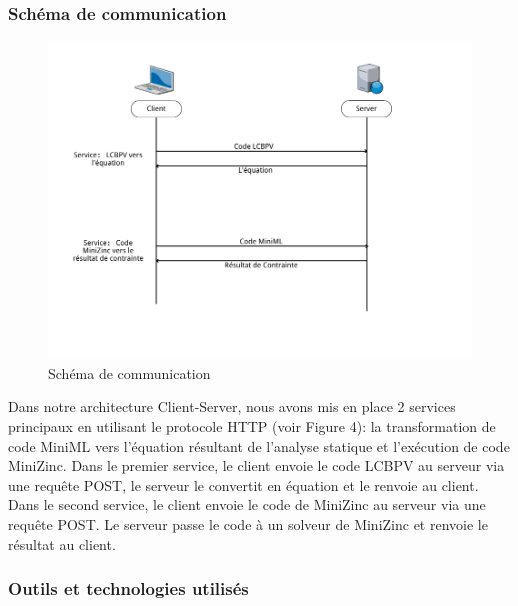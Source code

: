 \documentclass[12pt]{article}
\begin{document}
\hypertarget{schuxe9ma-de-communication}{%
      \subsubsection{Schéma de
            communication}\label{schuxe9ma-de-communication}}

\begin{figure}
      \centering
      \includegraphics{Figures/Communication.png}
      \caption{Schéma de communication}
\end{figure}

\newpage

Dans notre architecture Client-Server, nous avons mis en place 2
services principaux en utilisant le protocole HTTP (voir Figure 4): la
transformation de code MiniML vers l'équation résultant de l'analyse
statique et l'exécution de code MiniZinc. Dans le premier service, le
client envoie le code LCBPV au serveur via une requête POST, le serveur
le convertit en équation et le renvoie au client. Dans le second
service, le client envoie le code de MiniZinc au serveur via une requête
POST. Le serveur passe le code à un solveur de MiniZinc et renvoie le
résultat au client.

\iffalse
      \hypertarget{outils-et-technologies-utilisuxe9s-1}{%
            \subsubsection{Outils et technologies
                  utilisés}\label{outils-et-technologies-utilisuxe9s-1}}
\end{document}
